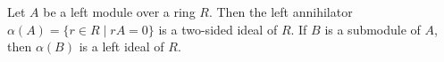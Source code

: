 Let $A$ be a left module over a ring $R$. Then the left annihilator $\alpha(A) = \{r \in R \mid rA = 0\}$ is a two-sided ideal of $R$. If $B$ is a submodule of $A$, then $\alpha(B)$ is a left ideal of $R$.
